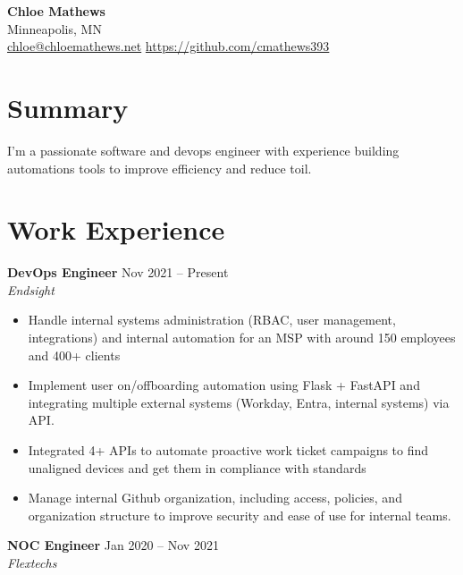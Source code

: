 \documentclass[11pt]{article}
\begin{document}
\begin{center}
  {\LARGE \textbf{Chloe Mathews}}\\[4pt]
  Minneapolis, MN \\
  \href{mailto:chloe@chloemathews.net}{chloe@chloemathews.net} \quad \href{https://github.com/cmathews393}{https://github.com/cmathews393}
\end{center}
\vspace{8pt}

\section*{Summary}
I'm a passionate software and devops engineer with experience building automations tools to improve efficiency and reduce toil. 

\section*{Work Experience}

\noindent\textbf{DevOps Engineer} \hfill \small{Nov 2021 -- Present}\\
\textit{Endsight}\\

\begin{itemize}[leftmargin=*]
  
    \item Handle internal systems administration (RBAC, user management, integrations) and internal automation for an MSP with around 150 employees and 400+ clients
  
    \item Implement user on/offboarding automation using Flask + FastAPI and integrating multiple external systems (Workday, Entra, internal systems) via API.
  
    \item Integrated 4+ APIs to automate proactive work ticket campaigns to find unaligned devices and get them in compliance with standards
  
    \item Manage internal Github organization, including access, policies, and organization structure to improve security and ease of use for internal teams.
  
\end{itemize}

\vspace{6pt}

\noindent\textbf{NOC Engineer} \hfill \small{Jan 2020 -- Nov 2021}\\
\textit{Flextechs}\\
\end{document}
